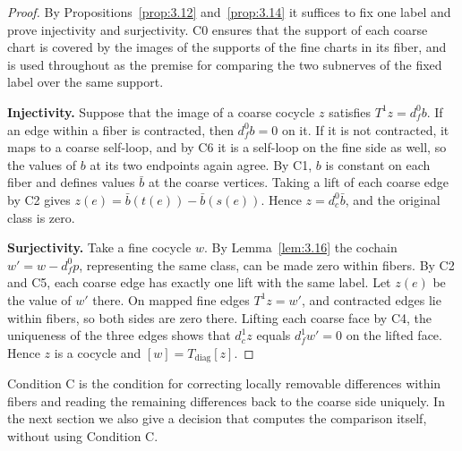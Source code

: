 \begin{proof}

By Propositions~\ref{prop:3.12} and~\ref{prop:3.14} it suffices to fix one label and
prove injectivity and surjectivity.
C0 ensures that the support of each coarse chart is covered by the images of the
supports of the fine charts in its fiber, and is used throughout as the premise for
comparing the two subnerves of the fixed label over the same support.

\textbf{Injectivity.}
Suppose that the image of a coarse cocycle $z$ satisfies $T^1z=d_f^0b$.
If an edge within a fiber is contracted, then $d_f^0b=0$ on it.
If it is not contracted, it maps to a coarse self-loop, and by C6 it is a self-loop
on the fine side as well, so the values of $b$ at its two endpoints again agree.
By C1, $b$ is constant on each fiber and defines values $\bar b$ at the coarse
vertices.
Taking a lift of each coarse edge by C2 gives
$z(e)=\bar b(t(e))-\bar b(s(e))$.
Hence $z=d_c^0\bar b$, and the original class is zero.

\textbf{Surjectivity.}
Take a fine cocycle $w$. By Lemma~\ref{lem:3.16} the cochain
$w'=w-d_f^0p$, representing the same class, can be made zero within fibers.
By C2 and C5, each coarse edge has exactly one lift with the same label.
Let $z(e)$ be the value of $w'$ there.
On mapped fine edges $T^1z=w'$, and contracted edges lie within fibers, so both sides
are zero there.
Lifting each coarse face by C4, the uniqueness of the three edges shows that
$d_c^1z$ equals $d_f^1w'=0$ on the lifted face.
Hence $z$ is a cocycle and $[w]=T_{\mathrm{diag}}[z]$.

\end{proof}

Condition C is the condition for correcting locally removable differences within
fibers and reading the remaining differences back to the coarse side uniquely.
In the next section we also give a decision that computes the comparison itself,
without using Condition C.

